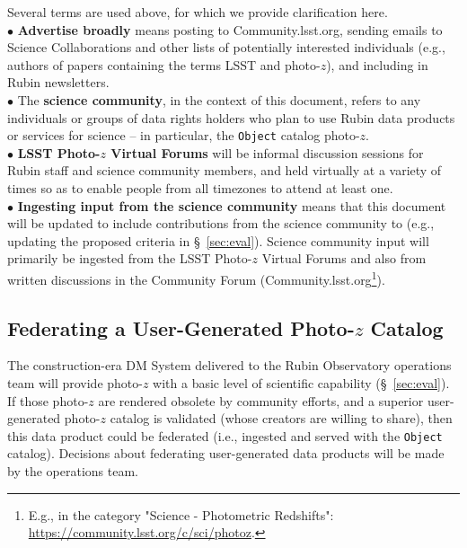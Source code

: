 \documentclass[DM,lsstdraft,toc]{lsstdoc}
\begin{document}
Several terms are used above, for which we provide clarification here. \\
$\bullet$ {\bf Advertise broadly} means posting to Community.lsst.org, sending emails to Science Collaborations and other lists of potentially interested individuals (e.g., authors of papers containing the terms LSST and photo-$z$), and including in Rubin newsletters. \\
$\bullet$ The {\bf science community}, in the context of this document, refers to any individuals or groups of data rights holders who plan to use Rubin data products or services for science -- in particular, the {\tt Object} catalog photo-$z$. \\
$\bullet$ {\bf LSST Photo-$z$ Virtual Forums} will be informal discussion sessions for Rubin staff and science community members, and held virtually at a variety of times so as to enable people from all timezones to attend at least one. \\
$\bullet$ {\bf Ingesting input from the science community} means that this document will be updated to include contributions from the science community to (e.g., updating the proposed criteria in \S~\ref{sec:eval}).
Science community input will primarily be ingested from the LSST Photo-$z$ Virtual Forums and also from written discussions in the Community Forum (Community.lsst.org\footnote{E.g., in the category "Science - Photometric Redshifts": \url{https://community.lsst.org/c/sci/photoz}.}).

\subsection{Federating a User-Generated Photo-$z$ Catalog}\label{ssec:time_ops_ugfed}

The construction-era DM System delivered to the Rubin Observatory operations team will provide photo-$z$ with a basic level of scientific capability (\S~\ref{sec:eval}). 
If those photo-$z$ are rendered obsolete by community efforts, and a superior user-generated photo-$z$ catalog is validated (whose creators are willing to share), then this data product could be federated (i.e., ingested and served with the {\tt Object} catalog).
Decisions about federating user-generated data products will be made by the operations team.
\end{document}

